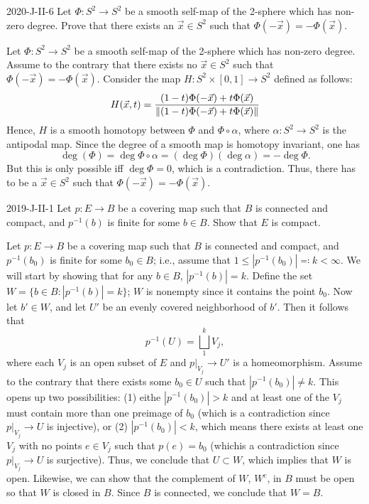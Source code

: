 \documentclass{article}
\begin{document}
	\begin{prb}{2020-J-II-6}
		Let $\Phi: S^2 \to S^2$ be a smooth self-map of the 2-sphere which has non-zero degree. Prove that there exists an $\vec{x} \in S^2$ such that $\Phi(-\vec{x}) =-\Phi(\vec{x})$. 
	\end{prb}
	Let $\Phi: S^2 \to S^2$ be a smooth self-map of the 2-sphere which has non-zero degree. Assume to the contrary that there exists no $\vec{x} \in S^2$ such that $\Phi(-\vec{x}) = -\Phi(\vec{x})$. Consider the map $H: S^2 \times [0,1] \to S^2$ defined as follows: 
	\begin{equation*}
		H(\vec{x}, t) = \frac{(1 - t)\Phi(-\vec{x}) + t\Phi(\vec{x})}{\left\Vert (1 - t)\Phi(-\vec{x}) + t\Phi(\vec{x}) \right\Vert}
	\end{equation*}
	Hence, $H$ is a smooth homotopy between $\Phi$ and $\Phi \circ \alpha$, where $\alpha: S^2 \to S^2$ is the antipodal map. Since the degree of a smooth map is homotopy invariant, one has 
	\begin{equation*}
		\deg(\Phi) = \deg{\Phi \circ \alpha} = (\deg{\Phi})(\deg{\alpha}) = -\deg{\Phi}. 
	\end{equation*}
	But this is only possible iff $\deg{\Phi} = 0$, which is a contradiction. Thus, there has to be a $\vec{x} \in S^{2}$ such that $\Phi(-\vec{x}) = -\Phi(\vec{x})$. 
	
	
	\begin{prb}{2019-J-II-1}
		Let $p: E \to B$ be a covering map such that $B$ is connected and compact, and $p^{-1}(b)$ is finite for some $b \in B$. Show that $E$ is compact. 
	\end{prb}
	Let $p: E \to B$ be a covering map such that $B$ is connected and compact, and $p^{-1}(b_{0})$ is finite for some $b_{0} \in B$; i.e., assume that $1 \leq |p^{-1}(b_{0})| \eqqcolon k < \infty$. We will start by showing that for any $b \in B$, $|p^{-1}(b)| = k$. Define the set $W = \{b \in B: |p^{-1}(b)| = k\}$; $W$ is nonempty since it contains the point $b_{0}$. Now let $b' \in W$, and let $U'$ be an evenly covered neighborhood of $b'$. Then it follows that 
	\begin{equation*}
		p^{-1}(U) = \bigsqcup_{1}^{k}V_{j}, 
	\end{equation*}
	where each $V_j$ is an open subset of $E$ and $p|_{V_{j}} \to U'$ is a homeomorphism. Assume to the contrary that there exists some $b_{0} \in U$ such that $|p^{-1}(b_{0})| \neq k$. This opens up two possibilities: (1) eithe $|p^{-1}(b_{0})| > k$ and at least one of the $V_{j}$ must contain more than one preimage of $b_{0}$ (which is a contradiction since $p|_{V_{j}} \to U$ is injective), or (2) $|p^{-1}(b_{0})| < k$, which means there exists at least one $V_{j}$ with no points $e \in V_{j}$ such that $p(e) = b_{0}$ (whichis a contradiction since $p|_{V_{j}} \to U$ is surjective). Thus, we conclude that $U \subset W$, which implies that $W$ is open. Likewise, we can show that the complement of $W$, $W^{c}$, in $B$ must be open so that $W$ is closed in $B$. Since $B$ is connected, we conclude that $W = B$. 
	
\end{document}
